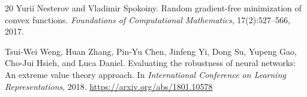 \documentclass[11pt]{article}
\begin{document}
\begin{thebibliography}{20}
Yurii Nesterov and Vladimir Spokoiny.
\newblock Random gradient-free minimization of convex functions.
\newblock \emph{Foundations of Computational Mathematics}, 17(2):527--566,
2017.

Tsui-Wei Weng, Huan Zhang, Pin-Yu Chen, Jinfeng Yi, Dong Su, Yupeng Gao,
Cho-Jui Hsieh, and Luca Daniel.
\newblock Evaluating the robustness of neural networks: An extreme value
theory approach.
\newblock In \emph{International Conference on Learning Representations},
2018.
\newblock \url{https://arxiv.org/abs/1801.10578}

\end{thebibliography}
\end{document}
